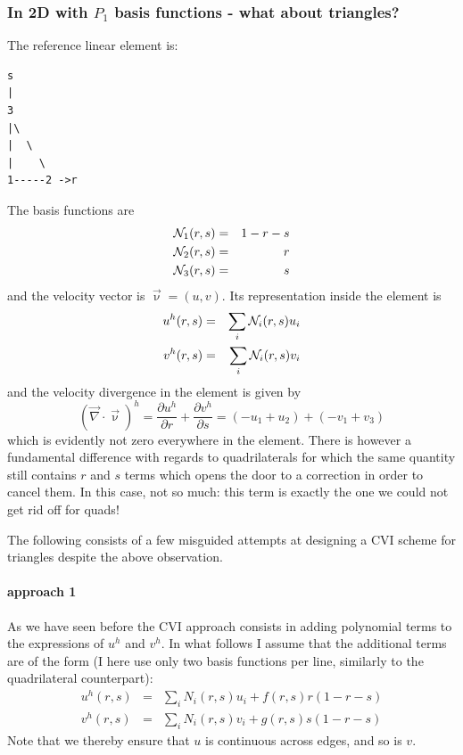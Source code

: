 \subsubsection{In 2D with $P_1$ basis functions - what about triangles?}


The reference linear element is: 
\begin{verbatim}
s
|
3
|\
|  \
|    \
1-----2 ->r
\end{verbatim}

The basis functions are 
\begin{eqnarray}
{\mathcal{N}}_1(r,s) &=& 1-r-s \nonumber\\
{\mathcal{N}}_2(r,s) &=& r \nonumber\\
{\mathcal{N}}_3(r,s) &=& s 
\end{eqnarray}
and the velocity vector is $\vec\upnu=(u,v)$. 
Its representation inside the element is 
\begin{eqnarray}
u^h(r,s)&=&\sum_i {\mathcal{N}}_i(r,s) u_i \nonumber\\
v^h(r,s)&=&\sum_i {\mathcal{N}}_i(r,s) v_i \nonumber
\end{eqnarray}
and the velocity divergence in the element is given by
\[
(\vec\nabla\cdot\vec\upnu)^h = 
\frac{\partial u^h}{\partial r}
+
\frac{\partial v^h}{\partial s}
=(-u_1+u_2)+(-v_1+v_3)
\]
which is evidently not zero everywhere in the element.
There is however a fundamental difference with regards to quadrilaterals
for which the same quantity still contains $r$ and $s$ terms which 
opens the door to a correction in order to cancel them.
In this case, not so much: this term is exactly the one
we could not get rid off for quads!

The following consists of a few misguided attempts at designing a 
CVI scheme for triangles despite the above observation.

\paragraph{approach 1}
As we have seen before the CVI approach consists in adding polynomial 
terms to the expressions of $u^h$ and $v^h$.
In what follows I assume that the additional terms are of the form 
(I here use only two basis functions per line, similarly to the quadrilateral counterpart):
\begin{eqnarray}
u^h(r,s)&=&\sum_i N_i(r,s) u_i + f(r,s) r(1-r-s) \\
v^h(r,s)&=&\sum_i N_i(r,s) v_i + g(r,s) s(1-r-s) 
\end{eqnarray}
Note that we thereby ensure that $u$ is continuous across edges, and so is $v$.

